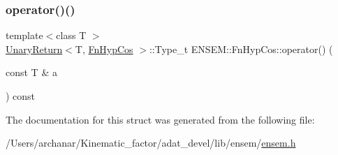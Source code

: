 \mbox{\label{structENSEM_1_1FnHypCos_abc3e4d24871bdf77186ed9f57adfcf1c}} 
\subsubsection{\texorpdfstring{operator()()}{operator()()}\hspace{0.1cm}{\footnotesize\ttfamily [2/2]}}
{\footnotesize\ttfamily template$<$class T $>$ \\
\mbox{\hyperlink{structENSEM_1_1UnaryReturn}{Unary\+Return}}$<$T, \mbox{\hyperlink{structENSEM_1_1FnHypCos}{Fn\+Hyp\+Cos}} $>$\+::Type\+\_\+t E\+N\+S\+E\+M\+::\+Fn\+Hyp\+Cos\+::operator() (\begin{DoxyParamCaption}\item[{const T \&}]{a }\end{DoxyParamCaption}) const\hspace{0.3cm}{\ttfamily [inline]}}



The documentation for this struct was generated from the following file\+:\begin{DoxyCompactItemize}
\item 
/\+Users/archanar/\+Kinematic\+\_\+factor/adat\+\_\+devel/lib/ensem/\mbox{\hyperlink{lib_2ensem_2ensem_8h}{ensem.\+h}}\end{DoxyCompactItemize}
